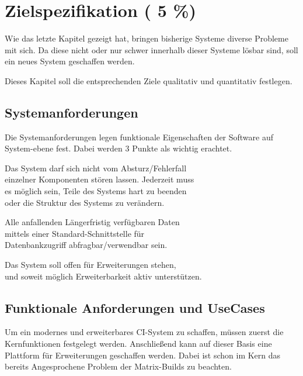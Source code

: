 \chapter{Zielspezifikation ( 5 \%)}
\label{chap:target}
Wie das letzte Kapitel gezeigt hat,
bringen bisherige Systeme diverse Probleme mit sich.
Da diese nicht oder nur schwer innerhalb dieser Systeme lösbar sind,
soll ein neues System geschaffen werden.

Dieses Kapitel soll die entsprechenden Ziele
qualitativ und quantitativ festlegen.






\section{Systemanforderungen}

Die Systemanforderungen legen funktionale Eigenschaften der Software auf System-ebene fest.
Dabei werden 3 Punkte als wichtig erachtet.


\begin{description}

\dhitem[S1]
  Das System darf sich nicht vom Absturz/Fehlerfall \\
  einzelner Komponenten stören lassen. Jederzeit muss \\
  es möglich sein, Teile des Systems hart zu beenden \\
  oder die Struktur des Systems zu verändern.

\dhitem[S2]
  Alle anfallenden Längerfristig verfügbaren Daten \\
  mittels einer Standard-Schnittstelle für \\
  Datenbankzugriff abfragbar/verwendbar sein.

\dhitem[S3]
  Das System soll offen für Erweiterungen stehen, \\
  und soweit möglich Erweiterbarkeit aktiv unterstützen.
\end{description}


\section{Funktionale Anforderungen und UseCases}

Um ein modernes und erweiterbares CI-System zu schaffen,
müssen zuerst die Kernfunktionen festgelegt werden.
Anschließend kann auf dieser Basis
eine Plattform für Erweiterungen geschaffen werden.
Dabei ist schon im Kern das bereits Angesprochene Problem
der Matrix-Builds zu beachten.


